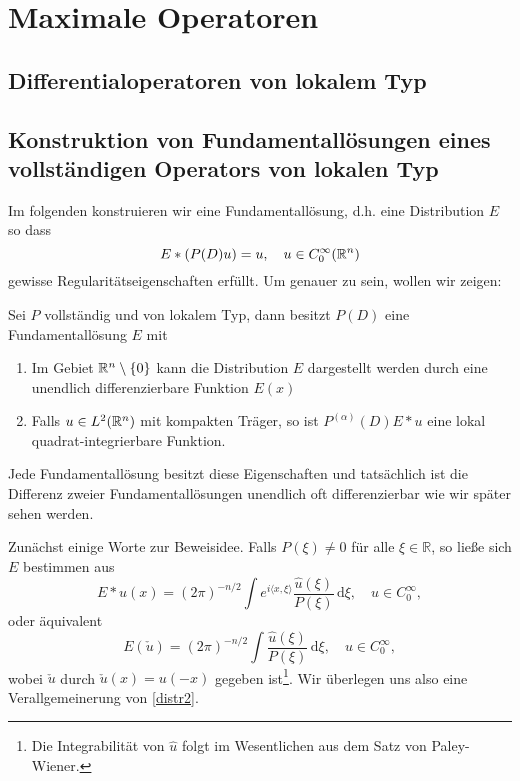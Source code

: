 \chapter{Maximale Operatoren}

\section{Differentialoperatoren von lokalem Typ} %


\section{Konstruktion von Fundamentallösungen eines vollständigen Operators von lokalen Typ} %

Im folgenden konstruieren wir eine Fundamentallösung, d.h. eine Distribution $E$ so dass
\begin{equation}
E*(P(D) u) = u, \quad u \in C_0^\infty(\mathbb R^n)
\end{equation}
gewisse Regularitätseigenschaften erfüllt.
Um genauer zu sein,  wollen wir zeigen:
\begin{thm}\label{fundamental_exist}
Sei $P$ vollständig und von lokalem Typ, dann besitzt $P(D)$ eine Fundamentallösung $E$ mit 
\begin{enumerate}
\item Im Gebiet $\mathbb R^n\setminus\{0\}$ kann die Distribution $E$
dargestellt werden durch eine unendlich differenzierbare Funktion $E(x)$
\item Falls $u\in L^2(\mathbb R^n)$ mit kompakten Träger, so ist $P^{(\alpha)}(D) E*u$ eine lokal quadrat-integrierbare Funktion. 
\end{enumerate}
\end{thm}
\begin{rem}
Jede Fundamentallösung besitzt diese Eigenschaften und tatsächlich ist die Differenz zweier Fundamentallösungen unendlich oft differenzierbar wie wir später sehen werden.
\end{rem}

Zunächst einige Worte zur Beweisidee.  Falls $P(\xi)\neq 0$ für alle $\xi\in \mathbb R$, so ließe sich $E$ bestimmen aus
\begin{equation}\label{distr1}
E*u(x) = (2\pi)^{-n/2}\int e^{i\langle x, \xi \rangle} \frac{\hat u(\xi)}{P(\xi)}\, \mathrm d\xi, \quad u \in C_0^\infty,
\end{equation}
oder äquivalent
\begin{equation}\label{distr2}
E(\check u)= (2\pi)^{-n/2} \int \frac{\hat u(\xi)}{P(\xi)}\, \mathrm d\xi, \quad u \in C_0^\infty,
\end{equation}
wobei $\check u$ durch $\check u(x)=u(-x)$ gegeben ist\footnote{Die Integrabilität von $\hat u$ folgt im Wesentlichen aus dem Satz von Paley-Wiener.}. Wir überlegen uns also eine Verallgemeinerung von \eqref{distr2}. 

